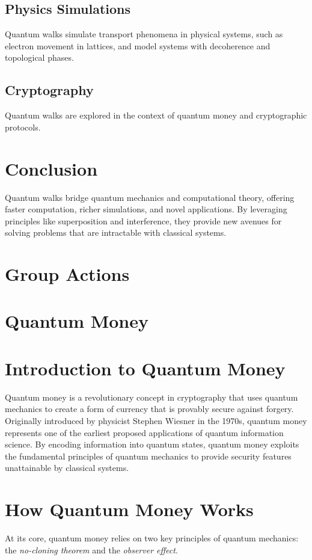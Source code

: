 \documentclass[11pt]{article}
\theoremstyle{definition}
\begin{document}
\subsection*{Physics Simulations}
Quantum walks simulate transport phenomena in physical systems, such as electron movement in lattices, and model systems with decoherence and topological phases.

\subsection*{Cryptography}
Quantum walks are explored in the context of quantum money and cryptographic protocols.

\section*{Conclusion}
Quantum walks bridge quantum mechanics and computational theory, offering faster computation, richer simulations, and novel applications. By leveraging principles like superposition and interference, they provide new avenues for solving problems that are intractable with classical systems.







\section{Group Actions}



\section{Quantum Money}


\section*{Introduction to Quantum Money}
Quantum money is a revolutionary concept in cryptography that uses quantum mechanics to create a form of currency that is provably secure against forgery. Originally introduced by physicist Stephen Wiesner in the 1970s, quantum money represents one of the earliest proposed applications of quantum information science. By encoding information into quantum states, quantum money exploits the fundamental principles of quantum mechanics to provide security features unattainable by classical systems.

\section*{How Quantum Money Works}
At its core, quantum money relies on two key principles of quantum mechanics: the \textit{no-cloning theorem} and the \textit{observer effect}.
\end{document}
